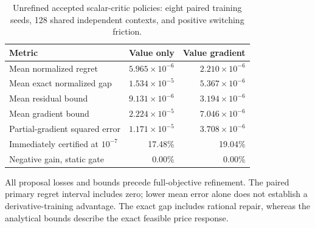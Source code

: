 \begin{table}[t]
\centering
\caption{Unrefined accepted scalar-critic policies: eight paired training seeds, 128 shared independent contexts, and positive switching friction.}
\label{tab:r14-quality}
\begin{tabular}{lrr}
\toprule
Metric & Value only & Value gradient\\
\midrule
Mean normalized regret & $5.965\times10^{-6}$ & $2.210\times10^{-6}$\\
Mean exact normalized gap & $1.534\times10^{-5}$ & $5.367\times10^{-6}$\\
Mean residual bound & $9.131\times10^{-6}$ & $3.194\times10^{-6}$\\
Mean gradient bound & $2.224\times10^{-5}$ & $7.046\times10^{-6}$\\
Partial-gradient squared error & $1.171\times10^{-5}$ & $3.708\times10^{-6}$\\
Immediately certified at $10^{-7}$ & 17.48\% & 19.04\%\\
Negative gain, static gate & 0.00\% & 0.00\%\\
\bottomrule
\end{tabular}
\par\smallskip
\begin{minipage}{0.94\linewidth}
All proposal losses and bounds precede full-objective refinement. The paired primary regret interval includes zero; lower mean error alone does not establish a derivative-training advantage. The exact gap includes rational repair, whereas the analytical bounds describe the exact feasible price response.
\end{minipage}
\end{table}
